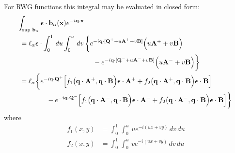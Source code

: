\documentclass[letterpaper]{article}
\newcommand{\vbEps}{\boldsymbol{\epsilon}}
\begin{document}
For RWG functions this integral may be evaluated in closed form:
\begin{align*}
&\!\!
\int_{\text{sup } \vb b_\alpha}
  \vbEps \cdot \vb b_\alpha(\vb x)e^{-i\vb q \cdot \vb x}
\\
&=\ell_\alpha\vbEps \cdot 
  \int_0^1 \, du \int_0^u \, dv \,
  \bigg\{
  e^{-i\vb q\cdot [\vb Q^+ + u \vb A^+ + v\vb B]}
  \Big(u\vb A^+ + v\vb B\Big)
\\ 
  &\hspace{1.5in}
  - 
  e^{-i\vb q\cdot [\vb Q^- + u \vb A^- + v\vb B]}
  \Big(u\vb A^- + v\vb B\Big)
  \bigg\}
\\
&=\ell_\alpha\bigg\{ 
  e^{-i\vb q \cdot \vb Q^+} 
  \Big[ f_1\big(\vb q\cdot \vb A^+, \vb q\cdot \vb B\Big) 
           \vbEps \cdot \vb A^+
       +f_2\big(\vb q\cdot \vb A^+, \vb q\cdot \vb B\Big)
           \vbEps \cdot \vb B
  \Big]
\\
&\qquad\qquad
  -
  e^{-i\vb q \cdot \vb Q^-} 
  \Big[ f_1\big(\vb q\cdot \vb A^-, \vb q\cdot \vb B\Big)
           \vbEps \cdot \vb A^-
       +f_2\big(\vb q\cdot \vb A^-, \vb q\cdot \vb B\Big)
           \vbEps \cdot \vb B
  \Big]\bigg\}
\\
\end{align*}
where
\begin{align*}
 f_1(x, y)&=\int_0^1 \, \int_0^u \, u e^{-i (ux + vy)} \,dv\,du  
\\
 f_2(x, y)&=\int_0^1 \, \int_0^u \, v e^{-i (ux + vy)} \,dv\,du  
\end{align*}
\end{document}
